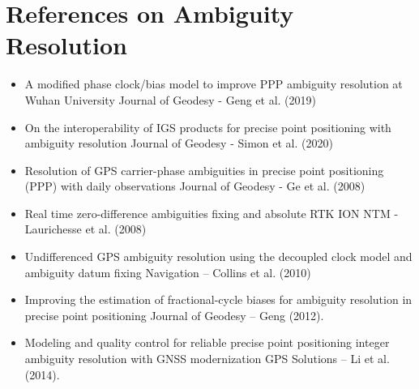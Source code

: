 \section{References on Ambiguity Resolution}
%
\begin{itemize}
    \item A modified phase clock/bias model to improve PPP ambiguity resolution at Wuhan University Journal of Geodesy - Geng et al. (2019)
    \item On the interoperability of IGS products for precise point positioning with ambiguity resolution Journal of Geodesy - Simon et al. (2020)
    \item Resolution of GPS carrier-phase ambiguities in precise point positioning (PPP) with daily observations Journal of Geodesy - Ge et al. (2008)
    \item Real time zero-difference ambiguities fixing and absolute RTK ION NTM - Laurichesse et al. (2008)
    \item Undifferenced GPS ambiguity resolution using the decoupled clock model and ambiguity datum fixing Navigation – Collins et al. (2010)
    \item Improving the estimation of fractional-cycle biases for ambiguity resolution in precise point positioning Journal of Geodesy – Geng (2012).
    \item Modeling and quality control for reliable precise point positioning integer ambiguity resolution with GNSS modernization
GPS Solutions – Li et al. (2014).
\end{itemize}